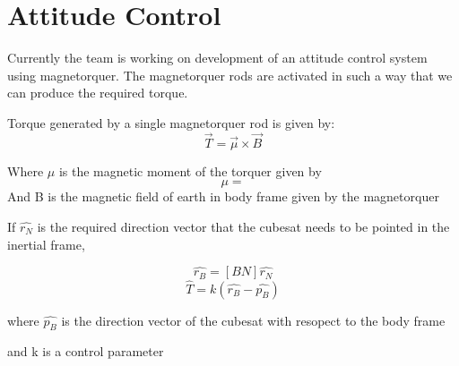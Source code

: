 \chapter{Attitude Control}

Currently the team is working on development of an attitude control system using magnetorquer. The magnetorquer rods are activated in such a way that we can produce the required torque.

Torque generated by a single magnetorquer rod is given by:
$$\vec{T}=\vec{\mu}\times\vec{B}$$

Where $ \mu$ is the magnetic moment of the torquer given by
$$\mu = $$
And B is the magnetic field of earth in body frame given by the magnetorquer

If $\hat{r_N}$ is the required direction vector that the cubesat needs to be pointed in the inertial frame,

$$ \hat{r_B} = [BN]\hat{r_N}$$
$$ \hat{T} = k(\hat{r_B}- \hat{p_B})$$

where $\hat{p_B}$ is the direction vector of the cubesat with resopect to the body frame

and k is a control parameter
